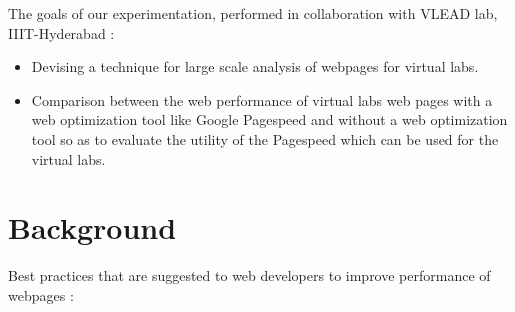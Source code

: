 \documentclass[a4paper,10pt]{IEEEtran}
\begin{document}
The goals of our experimentation, performed in collaboration with VLEAD lab,
IIIT-Hyderabad :

\begin{itemize}
\item Devising a technique for large scale analysis of webpages for virtual
labs.
\item Comparison between the web performance of virtual labs web pages with a
web optimization tool like Google Pagespeed and without a web optimization tool so as
to evaluate the utility of the Pagespeed which can be used for the virtual labs.
\end{itemize}

\section{Background}\label{sec-3}
Best practices that are suggested to web developers to improve
performance of webpages :
\end{document}

